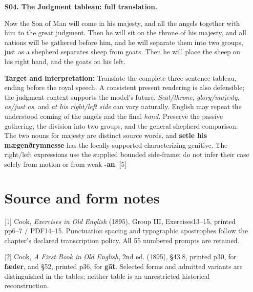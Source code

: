 \par\begin{minipage}{\linewidth}\raggedright
\textbf{S04. The Judgment tableau: full translation.}

Now the Son of Man will come in his majesty, and all the angels together with him to the great judgment. Then he will sit on the throne of his majesty, and all nations will be gathered before him, and he will separate them into two groups, just as a shepherd separates sheep from goats. Then he will place the sheep on his right hand, and the goats on his left.

\textbf{Target and interpretation:} Translate the complete three-sentence tableau, ending before the royal speech. A consistent present rendering is also defensible; the judgment context supports the model's future. \emph{Seat/\allowbreak{}throne}, \emph{glory/\allowbreak{}majesty}, \emph{as/\allowbreak{}just as}, and \emph{at his right/\allowbreak{}left side} can vary naturally. English may repeat the understood coming of the angels and the final \emph{hand}. Preserve the passive gathering, the division into two groups, and the general shepherd comparison. The two nouns for majesty are distinct source words, and \textbf{setle his mægenðrymnesse} has the locally supported characterizing genitive. The right/\allowbreak{}left expressions use the supplied bounded side-frame; do not infer their case solely from motion or from weak \textbf{-an}. [5]

\end{minipage}\par\addvspace{4pt}

\clearpage
\section*{Source and form notes}

\begingroup\fontsize{10}{12.8}\selectfont
[1] Cook, \emph{Exercises in Old English} (1895), Group III, Exercises13–15, printed pp6–7 /\allowbreak{} PDF14–15. Punctuation spacing and typographic apostrophes follow the chapter's declared transcription policy. All 55 numbered prompts are retained.

[2] Cook, \emph{A First Book in Old English}, 2nd ed. (1895), §43.8, printed p30, for \textbf{fæder}, and §52, printed p36, for \textbf{gāt}. Selected forms and admitted variants are distinguished in the tables; neither table is an unrestricted historical reconstruction.

